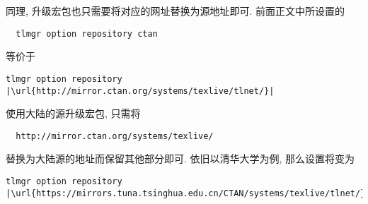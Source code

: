同理,
升级宏包也只需要将对应的网址替换为源地址即可.
前面正文中所设置的
\begin{lstlisting}
  tlmgr option repository ctan
\end{lstlisting}
等价于
\begin{lstlisting}[escapechar = |]
  tlmgr option repository |\url{http://mirror.ctan.org/systems/texlive/tlnet/}|
\end{lstlisting}
使用大陆的源升级宏包,
只需将
\begin{lstlisting}
  http://mirror.ctan.org/systems/texlive/
\end{lstlisting}
替换为大陆源的地址而保留其他部分即可.
依旧以清华大学为例,
那么设置将变为
\begin{lstlisting}[escapechar = |]
  tlmgr option repository |\url{https://mirrors.tuna.tsinghua.edu.cn/CTAN/systems/texlive/tlnet/}|
\end{lstlisting}
